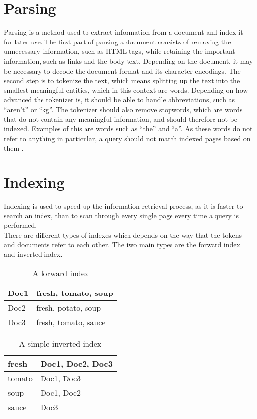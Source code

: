 \section{Parsing} \label{sec:parsing}
Parsing is a method used to extract information from a document and
index it for later use. The first part of parsing a document consists of
removing the unnecessary information, such as HTML tags, while retaining the
important information, such as links and the body text. Depending on the
document, it may be necessary to decode the document format and its character
encodings. 
The second step is to tokenize the text, which means splitting up
the text into the smallest meaningful entities, which in this context are
words. Depending on how advanced the tokenizer is, it should be able to handle
abbreviations, such as ``aren't'' or ``kg''. The tokenizer should also remove
stopwords, which are words that do not contain any meaningful information,
and should therefore not be indexed. Examples of this are words such as ``the''
and ``a''. As these words do not refer to anything in particular, a query should
not match indexed pages based on them \citep[Ch.
2]{manning2008introduction}.

\section{Indexing}
Indexing is used to speed up the information retrieval process, as it is faster
to search an index, than to scan through every single page every time a query is
performed.\\

There are different types of indexes which depends on the way that the tokens
and documents refer to each other. The two main types are the forward index and
inverted index.

\begin{minipage}{.40\textwidth}
  \centering
  \begin{table}[H]
	\centering
    \begin{tabular}{|l|l|}
\hline
Doc1 & fresh, tomato, soup \\ \hline
Doc2 & fresh, potato, soup \\ \hline
Doc3 & fresh, tomato, sauce \\ \hline
	\end{tabular}
	\caption{A forward index}
	\label{fIndex}
  \end{table}
\end{minipage}
\begin{minipage}{0.5\textwidth}
  \centering
  \begin{table}[H]
	\centering
    \begin{tabular}{|l|l|}
\hline
fresh & Doc1, Doc2, Doc3 \\ \hline
tomato & Doc1, Doc3 \\ \hline
soup & Doc1, Doc2 \\ \hline
sauce & Doc3 \\ \hline
	\end{tabular}
	\caption{A simple inverted index}
	\label{iIndex}
  \end{table}

\end{minipage}

